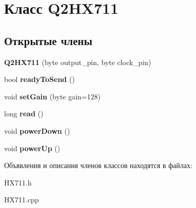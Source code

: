 \hypertarget{class_q2_h_x711}{\section{Класс Q2\-H\-X711}
\label{class_q2_h_x711}
}
\subsection*{Открытые члены}
\begin{DoxyCompactItemize}
\item 
\hypertarget{class_q2_h_x711_a208ccd48667f324db4147e6f9fb9de0b}{{\bfseries Q2\-H\-X711} (byte output\-\_\-pin, byte clock\-\_\-pin)}\label{class_q2_h_x711_a208ccd48667f324db4147e6f9fb9de0b}

\item 
\hypertarget{class_q2_h_x711_a256d004fa868e56797dabd8a8a715e99}{bool {\bfseries ready\-To\-Send} ()}\label{class_q2_h_x711_a256d004fa868e56797dabd8a8a715e99}

\item 
\hypertarget{class_q2_h_x711_a138e52716755008d82b5757817ca4c19}{void {\bfseries set\-Gain} (byte gain=128)}\label{class_q2_h_x711_a138e52716755008d82b5757817ca4c19}

\item 
\hypertarget{class_q2_h_x711_a54e05f8fe262121d17bcbfdb534ce1cf}{long {\bfseries read} ()}\label{class_q2_h_x711_a54e05f8fe262121d17bcbfdb534ce1cf}

\item 
\hypertarget{class_q2_h_x711_a2bcd4f4625b2bb90d0a5591543c03ed9}{void {\bfseries power\-Down} ()}\label{class_q2_h_x711_a2bcd4f4625b2bb90d0a5591543c03ed9}

\item 
\hypertarget{class_q2_h_x711_a32c55f1711c840bc3e6e210bc042b916}{void {\bfseries power\-Up} ()}\label{class_q2_h_x711_a32c55f1711c840bc3e6e210bc042b916}

\end{DoxyCompactItemize}


Объявления и описания членов классов находятся в файлах\-:\begin{DoxyCompactItemize}
\item 
H\-X711.\-h\item 
H\-X711.\-cpp\end{DoxyCompactItemize}
